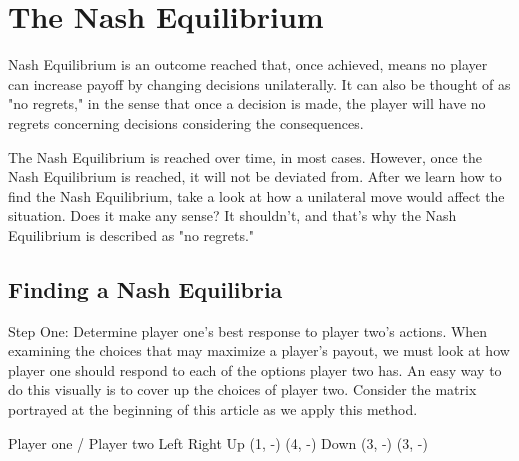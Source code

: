 \documentclass[a4paper,12pt]{article}
\begin{document}
\section{The Nash Equilibrium}
Nash Equilibrium is an outcome reached that, once achieved, means no player can increase payoff by changing decisions unilaterally. It can also be thought of as "no regrets," in the sense that once a decision is made, the player will have no regrets concerning decisions considering the consequences.

The Nash Equilibrium is reached over time, in most cases. However, once the Nash Equilibrium is reached, it will not be deviated from. After we learn how to find the Nash Equilibrium, take a look at how a unilateral move would affect the situation. Does it make any sense? It shouldn't, and that's why the Nash Equilibrium is described as "no regrets."

\subsection{Finding a Nash Equilibria}
Step One: Determine player one's best response to player two's actions.
When examining the choices that may maximize a player's payout, we must look at how player one should respond to each of the options player two has. An easy way to do this visually is to cover up the choices of player two. Consider the matrix portrayed at the beginning of this article as we apply this method.

Player one / Player two	Left	Right
Up	(1, -)	(4, -)
Down	(3, -)	(3, -)
\end{document}
